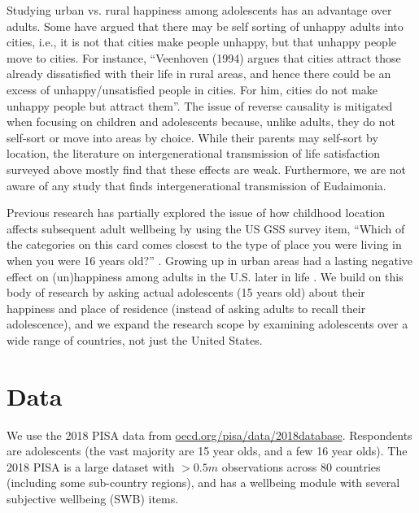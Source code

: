 \documentclass[11pt, letterpaper]{article}
\begin{document}
\begin{spacing}{1.9}
Studying urban vs. rural happiness among  adolescents has an advantage over adults. Some have argued that there may be self sorting of unhappy adults into cities, i.e., it is not that cities make people unhappy, but that unhappy people move to cities. For instance, ``Veenhoven (1994) argues that cities attract
those already dissatisfied with their life in rural areas, and hence there could
be an excess of unhappy/unsatisfied people in cities. For him, cities do not
make unhappy people but attract them''\citep[cited in][]{ebshoy24}. The issue of
reverse causality is mitigated when focusing on children and adolescents
because, 
unlike adults, they do not self-sort or move into areas by
choice. 
 While their parents may self-sort by location, the literature on
 intergenerational transmission of life satisfaction surveyed above
 \citep[e.g.,][]{bedin2014dyadic,casas2008does, casas2012testing}  mostly find that these effects
are weak. Furthermore, we are not aware of any study that finds
intergenerational transmission of Eudaimonia.

Previous research has partially explored the issue of how childhood location affects subsequent adult wellbeing by using the US GSS survey item,
``Which of the categories on this card comes closest to the type of place you
were living in when you were 16 years old?'' \citep{aok20}. Growing up in urban
areas had a lasting negative effect on (un)happiness among adults in the U.S. later
in life \citep{aok20}. We build on this body of research by asking actual
adolescents (15 years old) about their happiness and place of residence (instead
of asking adults to recall their adolescence), and we expand the research scope
by examining adolescents  over a wide range of countries, not just the United States. 


\section*{Data}

We use the 2018 PISA data %
 from \url{oecd.org/pisa/data/2018database}. Respondents are adolescents (the vast majority are 15 year olds, and a few 16 year olds).
The 2018 PISA is a large dataset with $>0.5m$ observations across 80 %
countries (including some sub-country regions), %
 and  has a wellbeing module with several subjective wellbeing (SWB) items. 


\end{spacing}
\end{document}
